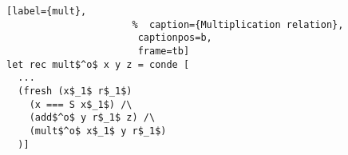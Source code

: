 \begin{figure}[!t]
  \centering
  \begin{minipage}{\columnwidth}
    \begin{lstlisting}[label={mult},
                      %  caption={Multiplication relation},
                       captionpos=b,
                       frame=tb]
let rec mult$^o$ x y z = conde [
  ...
  (fresh (x$_1$ r$_1$)
    (x === S x$_1$) /\
    (add$^o$ y r$_1$ z) /\
    (mult$^o$ x$_1$ y r$_1$)
  )]
    \end{lstlisting}
  \end{minipage}
\end{figure}
